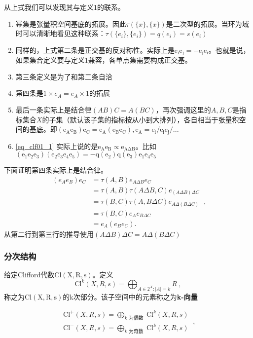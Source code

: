 从上式我们可以发现其与定义1的联系。
\begin{enumerate}
\item 幂集是张量积空间基底的拓展。因此$\tau(\{x\},\{x\})$是二次型的拓展。当环为域时可以清晰地看见这种联系：$\tau(\{e_i\},\{e_i\})=q(e_i)=s(e_i)$
\item 同样的，上式第二条是正交基的反对称性。实际上是$\mathrm {e_i e_j=-e_j e_i}$。也就是说，如果集合定义要与定义1兼容，各单点集需要构成正交基。
\item 第三条定义是为了和第二条自洽
\item 第四条是$1\times e_A=e_A\times 1$的拓展
\item 最后一条实际上是结合律$(AB)C=A(BC)$，再次强调这里的$A,B,C$是指标集合$X$的子集（默认该子集的指标按从小到大排列），各自相当于张量积空间的基底。即$\mathrm {(e_Ae_B)e_C=e_A(e_Be_C),e_A=e_i/e_ie_j/...}$
\item \autoref{eq_clf01_1} 实际上说的是$\mathrm {e_A e_B\propto e_{A\Delta B}}$。比如$\mathrm {(e_{1}e_{2}e_{3})(e_{2}e_{3}e_{4}e_{5})=-q(e_2)q(e_3)e_1 e_4 e_5}$
\end{enumerate}

下面证明第四条实际上是结合律。
\begin{equation}
\begin{aligned}
\left(e_A e_B\right) e_C & =\tau(A, B) e_{A \Delta B} e_C \\
& =\tau(A, B) \tau(A \Delta B, C) e_{(A \Delta B) \Delta C} \\
& =\tau(B, C) \tau(A, B \Delta C) e_{A \Delta(B \Delta C)} \\
& =\tau(B, C) e_A e_{B \Delta C} \\
& =e_A\left(e_B e_C\right) .
\end{aligned}~,
\end{equation}
从第二行到第三行的推导使用$(A \Delta B) \Delta C=A \Delta(B \Delta C)$
\subsubsection{分次结构}
\begin{definition}{}
给定Clifford代数$\mathrm {Cl(X,R,s)}$。定义
\begin{equation}
\mathrm{Cl}^k(X,R,s)=\bigoplus_{A \in 2^X:|A|=k}R~,
\end{equation}
称之为$\mathrm {Cl(X,R,s)}$的k次部分。该子空间中的元素称之为\textbf{k-向量}
\end{definition}
\begin{definition}{}
\begin{equation}
\begin{array}{l}
\mathrm{Cl}^{+}(X, R, s)=\bigoplus_{k \text { 为偶数 }} \mathrm{Cl}^k(X, R, s) \\
\mathrm{Cl}^{-}(X, R, s)=\bigoplus_{k \text { 为奇数 }} \mathrm{Cl}^k(X, R, s)
\end{array}~,
\end{equation}
\end{definition}






